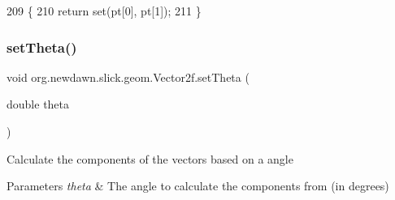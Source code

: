 \begin{DoxyCode}
209                                     \{
210         \textcolor{keywordflow}{return} \textcolor{keyword}{set}(pt[0], pt[1]);
211     \}
\end{DoxyCode}
\mbox{\label{classorg_1_1newdawn_1_1slick_1_1geom_1_1_vector2f_aa6922f08881bf7465883171ab2f8a61a}} 
\subsubsection{\texorpdfstring{set\+Theta()}{setTheta()}}
{\footnotesize\ttfamily void org.\+newdawn.\+slick.\+geom.\+Vector2f.\+set\+Theta (\begin{DoxyParamCaption}\item[{double}]{theta }\end{DoxyParamCaption})\hspace{0.3cm}{\ttfamily [inline]}}

Calculate the components of the vectors based on a angle


\begin{DoxyParams}{Parameters}
{\em theta} & The angle to calculate the components from (in degrees) \\
\hline
\end{DoxyParams}


